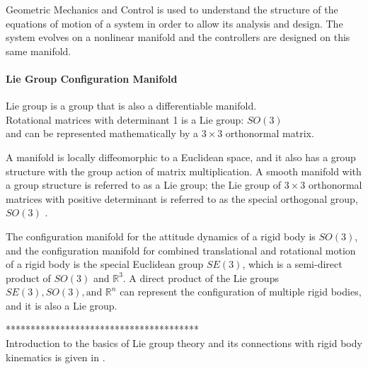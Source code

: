 Geometric Mechanics and Control is used to understand the structure of the equations of motion of a system in order to allow its analysis and design. The system evolves on a nonlinear manifold and the controllers are designed on this same manifold.\\




\paragraph{Lie Group Configuration Manifold} 

Lie group is a group that is also a differentiable manifold.\\

Rotational matrices with determinant 1 is a Lie group: $ SO(3) $\\


and can be represented mathematically by a $ 3\times 3 $ orthonormal matrix. 

A manifold is locally diffeomorphic to a Euclidean space, and it also has a group structure with the group action of matrix multiplication. A smooth manifold with a group structure is referred to as a Lie group; the Lie group of $ 3\times 3 $ orthonormal matrices with positive determinant is referred to as the special orthogonal group, $ SO(3) $ \cite{Murray1994}.


The configuration manifold for the attitude dynamics of a rigid body is $ SO(3) $, and the configuration manifold for combined translational and rotational motion of a rigid body is the special Euclidean group $ SE(3) $, which is a semi-direct product of $ SO(3)  $ and $ \mathbb{R}^3 $. A direct product of the Lie groups $ SE(3), SO(3), \text{and } \mathbb{R}^n $ can represent the configuration of multiple rigid bodies, and it is also a Lie group. 


***************************************\\
Introduction to the basics of Lie group theory and its connections with rigid body kinematics is given in \cite{Murray1994}. 



